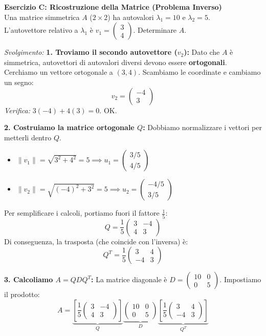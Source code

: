 \documentclass[10pt,a4paper]{article}
\begin{document}
\textbf{Esercizio C: Ricostruzione della Matrice (Problema Inverso)}
\\ Una matrice simmetrica $A$ ($2\times2$) ha autovalori $\lambda_1 = 10$ e $\lambda_2 = 5$.
\\ L'autovettore relativo a $\lambda_1$ è $v_1 = \begin{pmatrix} 3 \\ 4 \end{pmatrix}$. Determinare $A$.

\textit{Svolgimento:}
\textbf{1. Troviamo il secondo autovettore ($v_2$):}
Dato che $A$ è simmetrica, autovettori di autovalori diversi devono essere \textbf{ortogonali}.
Cerchiamo un vettore ortogonale a $(3, 4)$. Scambiamo le coordinate e cambiamo un segno:
\[ v_2 = \begin{pmatrix} -4 \\ 3 \end{pmatrix} \]
\textit{Verifica:} $3(-4) + 4(3) = 0$. OK.

\textbf{2. Costruiamo la matrice ortogonale $Q$:}
Dobbiamo normalizzare i vettori per metterli dentro $Q$.
\begin{itemize}
    \item $\|v_1\| = \sqrt{3^2+4^2} = 5 \implies u_1 = \begin{pmatrix} 3/5 \\ 4/5 \end{pmatrix}$
    \item $\|v_2\| = \sqrt{(-4)^2+3^2} = 5 \implies u_2 = \begin{pmatrix} -4/5 \\ 3/5 \end{pmatrix}$
\end{itemize}
Per semplificare i calcoli, portiamo fuori il fattore $\frac{1}{5}$:
\[ Q = \frac{1}{5} \begin{pmatrix} 3 & -4 \\ 4 & 3 \end{pmatrix} \]
Di conseguenza, la trasposta (che coincide con l'inversa) è:
\[ Q^T = \frac{1}{5} \begin{pmatrix} 3 & 4 \\ -4 & 3 \end{pmatrix} \]

\textbf{3. Calcoliamo $A = Q D Q^T$:}
La matrice diagonale è $D = \begin{pmatrix} 10 & 0 \\ 0 & 5 \end{pmatrix}$.
Impostiamo il prodotto:
\[ A = \underbrace{\left[ \frac{1}{5} \begin{pmatrix} 3 & -4 \\ 4 & 3 \end{pmatrix} \right]}_{Q} \underbrace{\begin{pmatrix} 10 & 0 \\ 0 & 5 \end{pmatrix}}_{D} \underbrace{\left[ \frac{1}{5} \begin{pmatrix} 3 & 4 \\ -4 & 3 \end{pmatrix} \right]}_{Q^T} \]
\end{document}
